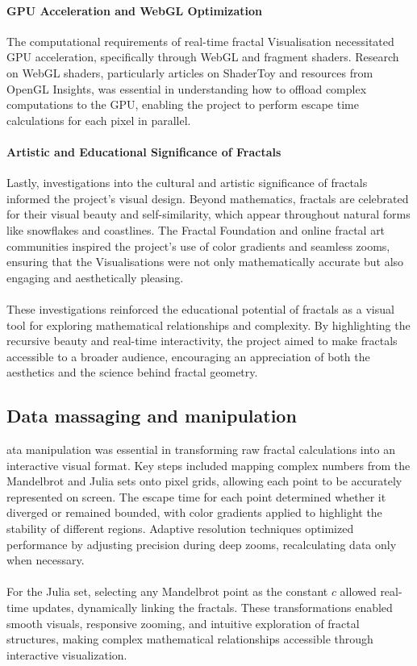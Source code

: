 \documentclass[12pt,a4paper]{report}
\begin{document}
\paragraph{GPU Acceleration and WebGL Optimization}
The computational requirements of real-time fractal Visualisation necessitated GPU acceleration, specifically through WebGL and fragment shaders. Research on WebGL shaders, particularly articles on ShaderToy and resources from OpenGL Insights, was essential in understanding how to offload complex computations to the GPU, enabling the project to perform escape time calculations for each pixel in parallel.

\paragraph{Artistic and Educational Significance of Fractals}
Lastly, investigations into the cultural and artistic significance of fractals informed the project’s visual design. Beyond mathematics, fractals are celebrated for their visual beauty and self-similarity, which appear throughout natural forms like snowflakes and coastlines. The Fractal Foundation and online fractal art communities inspired the project’s use of color gradients and seamless zooms, ensuring that the Visualisations were not only mathematically accurate but also engaging and aesthetically pleasing. 
\\\\
These investigations reinforced the educational potential of fractals as a visual tool for exploring mathematical relationships and complexity. By highlighting the recursive beauty and real-time interactivity, the project aimed to make fractals accessible to a broader audience, encouraging an appreciation of both the aesthetics and the science behind fractal geometry.

\subsection{Data massaging and manipulation}
ata manipulation was essential in transforming raw fractal calculations into an interactive visual format. Key steps included mapping complex numbers from the Mandelbrot and Julia sets onto pixel grids, allowing each point to be accurately represented on screen. The escape time for each point determined whether it diverged or remained bounded, with color gradients applied to highlight the stability of different regions. Adaptive resolution techniques optimized performance by adjusting precision during deep zooms, recalculating data only when necessary.
\\\\
For the Julia set, selecting any Mandelbrot point as the constant $c$ allowed real-time updates, dynamically linking the fractals. These transformations enabled smooth visuals, responsive zooming, and intuitive exploration of fractal structures, making complex mathematical relationships accessible through interactive visualization.
\end{document}
